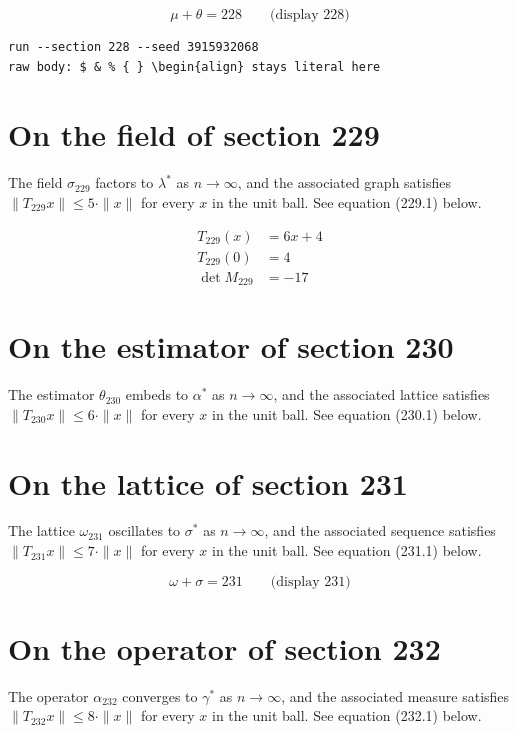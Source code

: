 \documentclass{article}
\begin{document}
$$
\mu + \theta = 228 \qquad \text{(display 228)}
$$

\begin{verbatim}
run --section 228 --seed 3915932068
raw body: $ & % { } \begin{align} stays literal here
\end{verbatim}

\section{On the field of section 229}
The field $\sigma_{229}$ factors to $\lambda^{*}$ as $n \to \infty$,
and the associated graph satisfies $\|T_{229} x\| \leq 5 \cdot \|x\|$
for every $x$ in the unit ball. See equation (229.1) below.

\begin{align}
T_{229}(x) &= 6 x + 4 \\
T_{229}(0) &= 4 \\
\det M_{229} &= -17
\end{align}

\section{On the estimator of section 230}
The estimator $\theta_{230}$ embeds to $\alpha^{*}$ as $n \to \infty$,
and the associated lattice satisfies $\|T_{230} x\| \leq 6 \cdot \|x\|$
for every $x$ in the unit ball. See equation (230.1) below.

\section{On the lattice of section 231}
The lattice $\omega_{231}$ oscillates to $\sigma^{*}$ as $n \to \infty$,
and the associated sequence satisfies $\|T_{231} x\| \leq 7 \cdot \|x\|$
for every $x$ in the unit ball. See equation (231.1) below.

$$
\omega + \sigma = 231 \qquad \text{(display 231)}
$$

\section{On the operator of section 232}
The operator $\alpha_{232}$ converges to $\gamma^{*}$ as $n \to \infty$,
and the associated measure satisfies $\|T_{232} x\| \leq 8 \cdot \|x\|$
for every $x$ in the unit ball. See equation (232.1) below.
\end{document}
